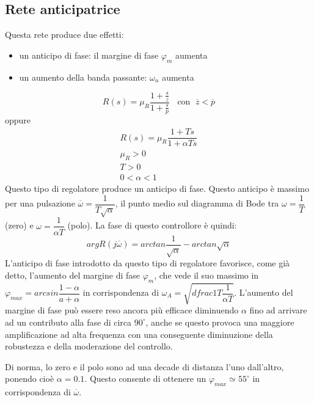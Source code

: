 \documentclass[a4paper]{report}
\begin{document}
\subsection{Rete anticipatrice}
Questa rete produce due effetti:
\begin{itemize}
\item un anticipo di fase: il margine di fase $\varphi_m$ aumenta
\item un aumento della banda passante: $\omega_n$ aumenta
\end{itemize}
\begin{equation}
  R(s) = \mu_R \dfrac{1 + \frac{s}{\overline{z}}}{1 +
    \frac{s}{\overline{p}}} \;\; \textrm{ con }\; \overline{z} < \overline{p}
\end{equation}
oppure
\begin{equation}
  \begin{array}{l}
    R(s) = \mu_R \dfrac{1 + Ts}{1 + \alpha Ts}\\
    \mu_R > 0\\
    T > 0\\
    0 < \alpha < 1
  \end{array}
\end{equation}
Questo tipo di regolatore produce un anticipo di fase. Questo anticipo
\`e massimo per una pulsazione $\overline{\omega} = \dfrac{1}{T
  \sqrt{\alpha}}$, il punto medio sul diagramma di Bode tra $\omega =
\dfrac{1}{T}$ (zero) e $\omega = \dfrac{1}{\alpha T}$ (polo).
La fase di questo controllore \`e quindi:
\begin{equation}
  arg R(j \overline{\omega}) = arctan \dfrac{1}{\sqrt{\alpha}} -
  arctan \sqrt{\alpha}
\end{equation}
L'anticipo di fase introdotto da questo tipo di regolatore favorisce,
come gi\`a detto, l'aumento del margine di fase $\varphi_m$, che vede
il suo massimo in $\varphi_{max} = arcsin \dfrac{1 - \alpha}{a +
  \alpha}$ in corrispondenza di $\omega_A = \sqrt{dfrac{1}{T}
  \dfrac{1}{\alpha T}}$. L'aumento del margine di fase pu\`o essere
reso ancora pi\`u efficace diminuendo $\alpha$ fino ad arrivare ad un
contributo alla fase di circa $90^{\circ}$, anche se questo provoca
una maggiore amplificazione ad alta frequenza con una conseguente
diminuzione della robustezza e della moderazione del controllo.

Di norma, lo zero e il polo sono ad una decade di distanza l'uno
dall'altro, ponendo cio\`e $\alpha = 0.1$. Questo consente di ottenere
un $\varphi_{max} \simeq 55^{\circ}$ in corrispondenza di
$\overline{\omega}$.
\end{document}
